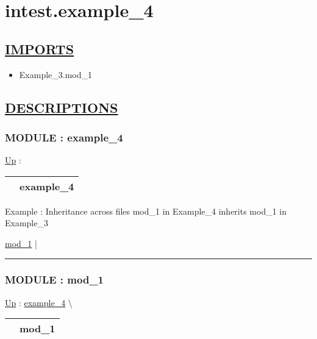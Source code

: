 \chapter*{intest.example\_4}
\hypertarget{ecldoc:toc:intest.example_4}{}

\section*{\underline{IMPORTS}}
\begin{itemize}
\item Example\_3.mod\_1
\end{itemize}

\section*{\underline{DESCRIPTIONS}}
\subsection*{MODULE : example\_4}
\hypertarget{ecldoc:intest.example_4}{}
\hyperlink{ecldoc:toc:intest}{Up} :

{\renewcommand{\arraystretch}{1.5}
\begin{tabularx}{\textwidth}{|>{\raggedright\arraybackslash}l|X|}
\hline
\hspace{0pt} & example\_4 \\
\hline
\end{tabularx}
}

\par
Example : Inheritance across files mod\_1 in Example\_4 inherits mod\_1 in Example\_3


\hyperlink{ecldoc:intest.example_4.mod_1}{mod\_1}  |

\rule{\linewidth}{0.5pt}

\subsection*{MODULE : mod\_1}
\hypertarget{ecldoc:intest.example_4.mod_1}{}
\hyperlink{ecldoc:intest.example_4}{Up} :
\hspace{0pt} \hyperlink{ecldoc:intest.example_4}{example_4} \textbackslash 

{\renewcommand{\arraystretch}{1.5}
\begin{tabularx}{\textwidth}{|>{\raggedright\arraybackslash}l|X|}
\hline
\hspace{0pt} & mod\_1 \\
\hline
\end{tabularx}
}

